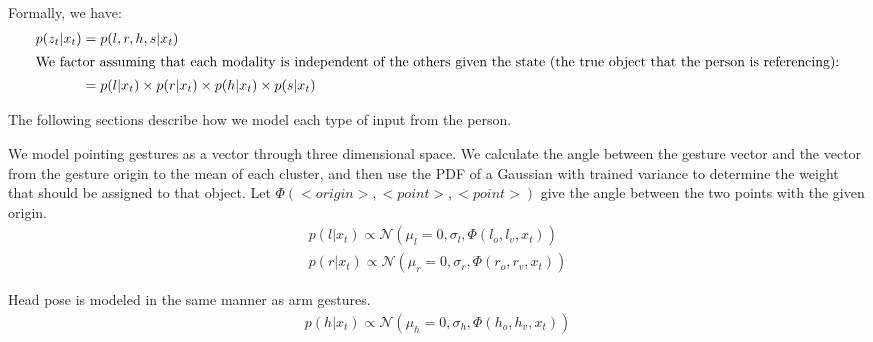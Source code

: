 \documentclass[letterpaper, 10 pt, conference]{ieeeconf}
\begin{document}
Formally, we have:
\begin{align}
p(z_t | x_t) &= p(l, r, h, s | x_t)\\
\intertext{We factor assuming that each modality is independent of the others given the state (the true object that the person is referencing):}
&= p(l | x_t) \times p(r | x_t) \times p(h | x_t) \times p(s | x_t)
\end{align}

\noindent The following sections describe how we model each type of
input from the person.

  We model pointing gestures as a vector through three
dimensional space. We calculate the angle between the gesture vector
and the vector from the gesture origin to the mean of each cluster,
and then use the PDF of a Gaussian with trained variance to determine
the weight that should be assigned to that object. Let $\Phi(<origin>,
<point>, <point>)$ give the angle between the two points with the
given origin.
\begin{align}
p(l | x_t) \propto \mathcal{N}(\mu_l=0, \sigma_l,\Phi(l_o, l_v, x_t))\\
p(r | x_t) \propto \mathcal{N}(\mu_r=0, \sigma_r,\Phi(r_o, r_v, x_t))
\end{align}

Head pose is modeled in the same manner as arm gestures.
\begin{align}
p(h | x_t) \propto \mathcal{N}(\mu_h=0, \sigma_h,\Phi(h_o, h_v, x_t))
\end{align}
\end{document}
